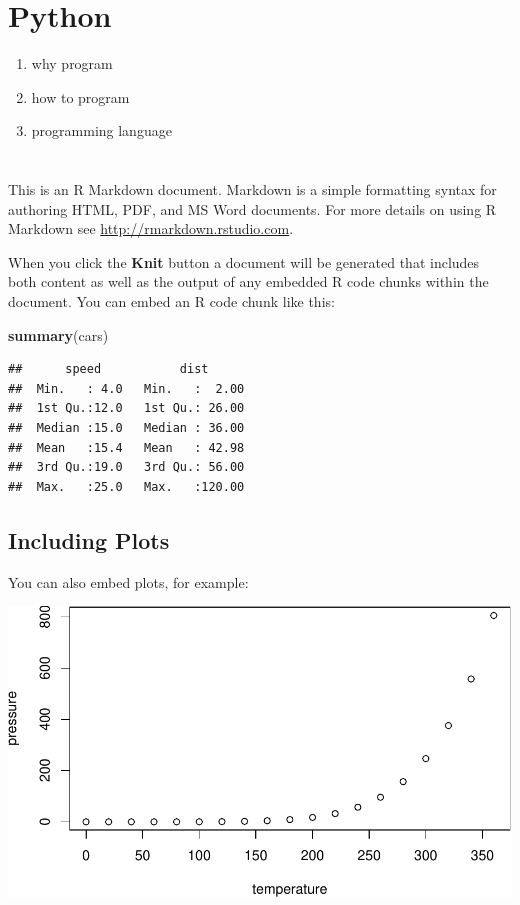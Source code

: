 \documentclass[]{book}
\makeatletter
\newenvironment{Shaded}{\begin{snugshade}}{\end{snugshade}}
\newcommand{\KeywordTok}[1]{\textcolor[rgb]{0.13,0.29,0.53}{\textbf{#1}}}
\newcommand{\NormalTok}[1]{#1}
\newenvironment{kframe}{%
\medskip{}
\setlength{\fboxsep}{.8em}
 \def\at@end@of@kframe{}%
 \ifinner\ifhmode%
  \def\at@end@of@kframe{\end{minipage}}%
  \begin{minipage}{\columnwidth}%
 \fi\fi%
 \def\FrameCommand##1{\hskip\@totalleftmargin \hskip-\fboxsep
 \colorbox{shadecolor}{##1}\hskip-\fboxsep
     \hskip-\linewidth \hskip-\@totalleftmargin \hskip\columnwidth}%
 \MakeFramed {\advance\hsize-\width
   \@totalleftmargin\z@ \linewidth\hsize
   \@setminipage}}%
 {\par\unskip\endMakeFramed%
 \at@end@of@kframe}
\renewenvironment{Shaded}{\begin{kframe}}{\end{kframe}}
\makeatother
\begin{document}
\hypertarget{python}{%
\chapter{Python}\label{python}}

\begin{enumerate}
\def\labelenumi{\arabic{enumi}.}
\item
  why program
\item
  how to program
\item
  programming language
\end{enumerate}

\hypertarget{section-7}{%
\chapter{}\label{section-7}}

This is an R Markdown document. Markdown is a simple formatting syntax for authoring HTML, PDF, and MS Word documents. For more details on using R Markdown see \url{http://rmarkdown.rstudio.com}.

When you click the \textbf{Knit} button a document will be generated that includes both content as well as the output of any embedded R code chunks within the document. You can embed an R code chunk like this:

\begin{Shaded}
\begin{Highlighting}[]
\KeywordTok{summary}\NormalTok{(cars)}
\end{Highlighting}
\end{Shaded}

\begin{verbatim}
##      speed           dist       
##  Min.   : 4.0   Min.   :  2.00  
##  1st Qu.:12.0   1st Qu.: 26.00  
##  Median :15.0   Median : 36.00  
##  Mean   :15.4   Mean   : 42.98  
##  3rd Qu.:19.0   3rd Qu.: 56.00  
##  Max.   :25.0   Max.   :120.00
\end{verbatim}

\hypertarget{including-plots}{%
\section{Including Plots}\label{including-plots}}

You can also embed plots, for example:

\includegraphics{bioinfBookXIE186_files/figure-latex/pressure-1.pdf}
\end{document}

